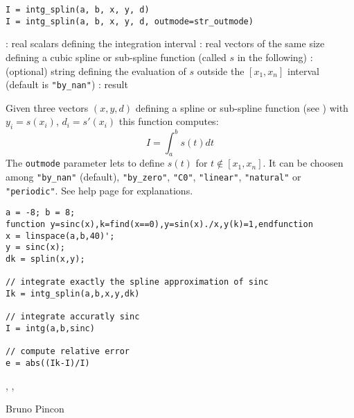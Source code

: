 
\begin{mandesc}
\end{mandesc}

\begin{calling_sequence}
    \begin{verbatim}
I = intg_splin(a, b, x, y, d)
I = intg_splin(a, b, x, y, d, outmode=str_outmode)
    \end{verbatim}
\end{calling_sequence}

\begin{parameters}
  \begin{varlist}
   : real scalars defining the integration interval
   : real vectors of the same size defining a cubic spline or sub-spline function 
                (called $s$ in the following)
                : (optional) string defining the evaluation of $s$ outside the $[x_1,x_n]$ interval
                (default is \verb+"by_nan"+)
   : result
  \end{varlist}
\end{parameters}

\begin{mandescription}
    Given three vectors $(x,y,d)$ defining a spline or sub-spline function
    (see  ) with $y_i=s(x_i)$, $d_i = s'(x_i)$ this function
    computes:
$$
    I = \int_a^b s(t) dt
$$
    The \verb!outmode! parameter lets to define $s(t)$ for $t \notin [x_1,x_n]$.
 It can be choosen among \verb+"by_nan"+ (default),  \verb+"by_zero"+,  \verb+"C0"+,
    \verb+"linear"+,  \verb+"natural"+ or  \verb+"periodic"+. See 
 help page for explanations.

  \end{mandescription}

  \begin{examples}

\begin{Verbatim}
a = -8; b = 8;
function y=sinc(x),k=find(x==0),y=sin(x)./x,y(k)=1,endfunction
x = linspace(a,b,40)';
y = sinc(x);
dk = splin(x,y);

// integrate exactly the spline approximation of sinc
Ik = intg_splin(a,b,x,y,dk)

// integrate accuratly sinc 
I = intg(a,b,sinc)

// compute relative error
e = abs((Ik-I)/I)
\end{Verbatim}

\end{examples}

\begin{manseealso}
, , 
\end{manseealso}

\begin{authors}
    Bruno Pincon
\end{authors}

